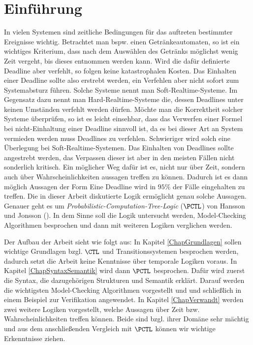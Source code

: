 \section{Einführung}

In vielen Systemen sind zeitliche Bedingungen für das auftreten bestimmter Ereignisse wichtig.
Betrachtet man bspw. einen Getränkeautomaten, so ist ein wichtiges Kriterium, dass nach dem Auswählen des Getränks möglichst wenig Zeit vergeht, bis dieses entnommen werden kann.
Wird die dafür definierte Deadline aber verfehlt, so folgen keine katastrophalen Kosten.
Das Einhalten einer Deadline sollte also erstrebt werden, ein Verfehlen aber nicht sofort zum Systemabsturz führen.
Solche Systeme nennt man Soft-Realtime-Systeme.
Im Gegensatz dazu nennt man Hard-Realtime-Systeme die, dessen Deadlines unter keinen Umständen verfehlt werden dürfen.
Möchte man die Korrektheit solcher Systeme überprüfen, so ist es leicht einsehbar, dass das Verwerfen einer Formel bei nicht-Einhaltung einer Deadline sinnvoll ist, da es bei dieser Art an System vermieden werden muss Deadlines zu verfehlen.
Schwieriger wird solch eine Überlegung bei Soft-Realtime-Systemen.
Das Einhalten von Deadlines sollte angestrebt werden, das Verpassen dieser ist aber in den meisten Fällen nicht sonderlich kritisch.
Ein möglicher Weg dafür ist es, nicht nur über Zeit, sondern auch über Wahrscheinlichkeiten aussagen treffen zu können.
Dadurch ist es dann möglich Aussagen der Form \glqq{}Eine Deadline wird in $95\%$ der Fälle eingehalten\grqq{} zu treffen.
Die in dieser Arbeit diskutierte Logik ermöglicht genau solche Aussagen.
Genauer geht es um \textit{Probabilistic-Computation-Tree-Logic} ($\PCTL$) von Hansson und Jonsson (\cite{hansson1994logic}).
In dem Sinne soll die Logik untersucht werden, Model-Checking Algorithmen besprochen und dann mit weiteren Logiken verglichen werden.

Der Aufbau der Arbeit sieht wie folgt aus: 
In Kapitel \ref{ChapGrundlagen} sollen wichtige Grundlagen bzgl. $\CTL$ und Transitionssystemen besprochen werden, dadurch setzt die Arbeit keine Kenntnisse über temporale Logiken voraus.
In Kapitel \ref{ChapSyntaxSemantik} wird dann $\PCTL$ besprochen.
Dafür wird zuerst die Syntax, die dazugehörigen Strukturen und Semantik erklärt.
Darauf werden die wichtigsten Model-Checking Algorithmen vorgestellt und und schließlich in einem Beispiel zur Verifikation angewendet.
In Kapitel \ref{ChapVerwandt} werden zwei weitere Logiken vorgestellt, welche Aussagen über Zeit bzw. Wahrscheinlichkeiten treffen können.
Beide sind bzgl. ihrer Domäne sehr mächtig und aus dem anschließenden Vergleich mit $\PCTL$ können wir wichtige Erkenntnisse ziehen.

